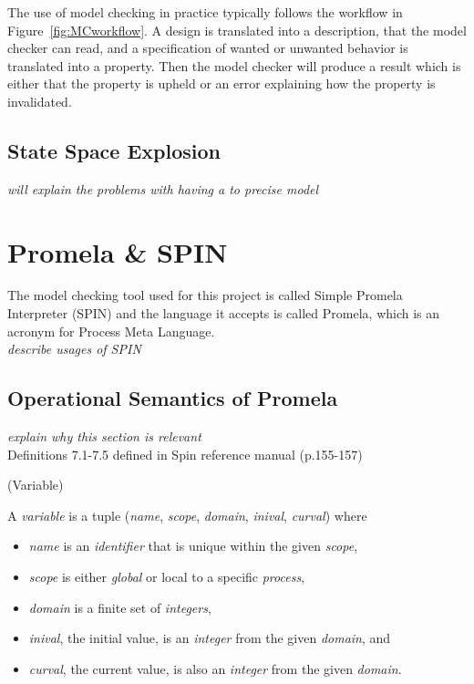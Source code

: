 
The use of model checking in practice typically follows the workflow in Figure~\ref{fig:MCworkflow}. A design is translated into a description, that the model checker can read, and a specification of wanted or unwanted behavior is translated into a property. Then the model checker will produce a result which is either that the property is upheld or an error explaining how the property is invalidated. 

\subsection{State Space Explosion}

\textit{will explain the problems with having a to precise model}

\section{Promela \& SPIN}

The model checking tool used for this project is called Simple Promela Interpreter (SPIN) and the language it accepts is called Promela, which is an acronym for Process Meta Language. \\

\textit{describe usages of SPIN}

\subsection{Operational Semantics of Promela}

\textit{explain why this section is relevant} \\

Definitions 7.1-7.5 defined in Spin reference manual (p.155-157) \cite{spinreferencemanualbook}

\begin{definition}{}{}
\label{def:Variable}
(Variable) 

A \textit{variable} is a tuple (\textit{name}, \textit{scope}, \textit{domain}, \textit{inival}, \textit{curval}) where

\begin{itemize}
\item[] \textit{name} is an \textit{identifier} that is unique within the given \textit{scope},
\item[] \textit{scope} is either \textit{global} or local to a specific \textit{process},
\item[] \textit{domain} is a finite set of \textit{integers},
\item[] \textit{inival}, the initial value, is an \textit{integer} from the given \textit{domain}, and
\item[] \textit{curval}, the current value, is also an \textit{integer} from the given \textit{domain}.
\end{itemize}
\end{definition}

